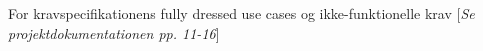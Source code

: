 For kravspecifikationens fully dressed use cases og ikke-funktionelle krav [\textit{Se projektdokumentationen pp. 11-16}]

%
%
%
%

